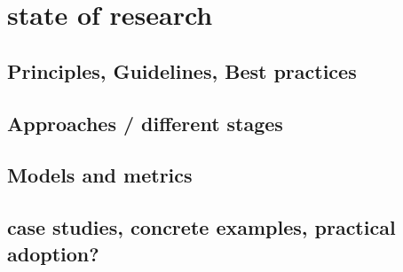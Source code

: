 \section{state of research}



\subsection{Principles, Guidelines, Best practices}


\subsection{Approaches / different stages} %

\subsection{Models and metrics} %


\subsection{case studies, concrete examples, practical adoption?}

